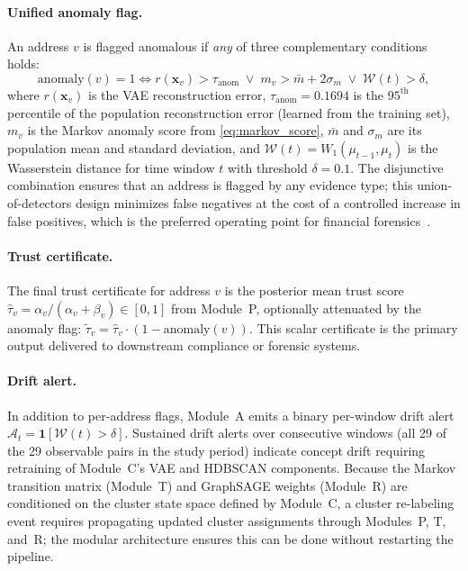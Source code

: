 \documentclass[journal]{IEEEtran}
\begin{document}
\paragraph{Unified anomaly flag.}
An address $v$ is flagged anomalous if \emph{any} of three complementary
conditions holds:
\begin{equation}
  \mathrm{anomaly}(v) = 1 \iff
    r(\mathbf{x}_v) > \tau_{\mathrm{anom}}
    \;\lor\;
    m_v > \bar{m} + 2\sigma_m
    \;\lor\;
    \mathcal{W}(t) > \delta,
  \label{eq:anomaly_flag}
\end{equation}
where $r(\mathbf{x}_v)$ is the VAE reconstruction error,
$\tau_{\mathrm{anom}} = 0.1694$ is the $95^{\mathrm{th}}$ percentile of the
population reconstruction error (learned from the training set),
$m_v$ is the Markov anomaly score from \eqref{eq:markov_score},
$\bar{m}$ and $\sigma_m$ are its population mean and standard deviation, and
$\mathcal{W}(t) = W_1(\mu_{t-1}, \mu_t)$ is the Wasserstein distance for
time window $t$ with threshold $\delta = 0.1$.
The disjunctive combination ensures that an address is flagged by any
evidence type; this union-of-detectors design minimizes false negatives at the
cost of a controlled increase in false positives, which is the preferred
operating point for financial forensics~\cite{Bahnsen2016}.

\paragraph{Trust certificate.}
The final trust certificate for address $v$ is the posterior mean trust score
$\hat{\tau}_v = \alpha_v / (\alpha_v + \beta_v) \in [0,1]$ from Module~P,
optionally attenuated by the anomaly flag:
$\tilde{\tau}_v = \hat{\tau}_v \cdot (1 - \mathrm{anomaly}(v))$.
This scalar certificate is the primary output delivered to downstream
compliance or forensic systems.

\paragraph{Drift alert.}
In addition to per-address flags, Module~A emits a binary per-window drift
alert $\mathcal{A}_t = \mathbf{1}[\mathcal{W}(t) > \delta]$.
Sustained drift alerts over consecutive windows (all 29 of the 29 observable
pairs in the study period) indicate concept drift requiring retraining of
Module~C's VAE and HDBSCAN components.
Because the Markov transition matrix (Module~T) and GraphSAGE weights
(Module~R) are conditioned on the cluster state space defined by Module~C,
a cluster re-labeling event requires propagating updated cluster assignments
through Modules~P, T, and~R; the modular architecture ensures this can be
done without restarting the pipeline.
\end{document}
